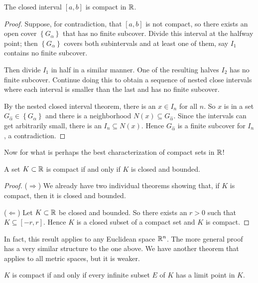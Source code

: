 \documentclass[../m131main.tex]{subfiles}
\begin{document}
\begin{theorem}[]
    The closed interval $[a,b]$ is compact in $\mathbb{R}$.
\end{theorem}

\begin{proof}
    Suppose, for contradiction, that $[a,b]$ is not compact, so there exists an open cover $\left\{ G_\alpha \right\}$ that has no finite subcover.
    Divide this interval at the halfway point; then $\left\{ G_\alpha \right\}$ covers both subintervals and at least one of them, say $I_1$ contains no finite subcover.

    Then divide $I_1$ in half in a similar manner.
    One of the resulting halves $I_2$ has no finite subcover.
    Continue doing this to obtain a sequence of nested close intervals where each interval is smaller than the last and has no finite subcover.

    By the nested closed interval theorem, there is an $x \in I_n$ for all $n$.
    So $x$ is in a set $G_{\hat \alpha} \in \left\{ G_\alpha \right\}$ and there is a neighborhood $N(x) \subseteq G_{\hat \alpha}$.
    Since the intervals can get arbitrarily small, there is an $I_n \subseteq N(x)$.
    Hence $G_{\hat \alpha}$ is a finite subcover for $I_n$, a contradiction.
\end{proof}

Now for what is perhaps the best characterization of compact sets in $\mathbb{R}$!

\begin{theorem}
    A set $K \subset \mathbb{R}$ is compact if and only if $K$ is closed and bounded.
\end{theorem}

\begin{proof}
    ($\Rightarrow$)
    We already have two individual theorems showing that, if $K$ is compact, then it is closed and bounded.
    \smallskip

    ($\Leftarrow$)
    Let $K \subset \mathbb{R}$ be closed and bounded.
    So there exists an $r > 0$ such that $K \subseteq [-r, r]$.
    Hence $K$ is a closed subset of a compact set and $K$ is compact.
\end{proof}

In fact, this result applies to any Euclidean space $\mathbb{R}^n$.
The more general proof has a very similar structure to the one above.
We have another theorem that applies to all metric spaces, but it is weaker.

\begin{theorem}[]
    $K$ is compact if and only if every infinite subset $E$ of $K$ has a limit point in $K$.
\end{theorem}
\end{document}
